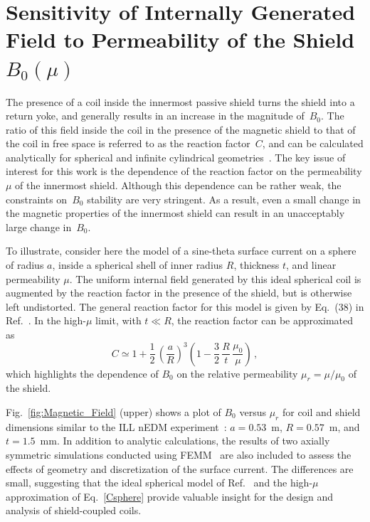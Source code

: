 

\section{Sensitivity of Internally Generated Field to Permeability of the Shield $B_0(\mu)$\label{sec:calculation}}

The presence of a coil inside the innermost passive shield turns the
shield into a return yoke, and generally results in an increase in the
magnitude of~$B_0$. The ratio of this field inside the coil in the
presence of the magnetic shield to that of the coil in free space is
referred to as the reaction factor~$C$, and can be calculated
analytically for spherical and infinite cylindrical
geometries~\cite{bidinosti2014passive,urankar1996design}. The key issue of
interest for this work is the dependence of the reaction factor on the
permeability $\mu$ of the innermost shield.  Although this dependence
can be rather weak, the constraints on~$B_0$ stability are very
stringent. As a result, even a small change in the magnetic
properties of the innermost shield can result in an unacceptably large
change in~$B_0$.


To illustrate, consider here the model of a sine-theta surface
current on a sphere of radius $a$, inside a spherical shell of inner
radius $R$, thickness $t$, and linear permeability $\mu$. The uniform
internal field generated by this ideal spherical coil is augmented by
the reaction factor in the presence of the shield, but is otherwise
left undistorted.  The general reaction factor for this model is given
by Eq.~(38) in Ref.~\cite{bidinosti2014passive}.  In the high-$\mu$
limit, with $t\ll R$, the reaction factor can be approximated as
\begin{equation}
C 
 \simeq 1+ \frac{1}{2}\, \left( \frac{a}{R} \right)^{3} \left( 1- \frac{3}{2} \, \frac{R}{t} \, \frac{\mu_0}{\mu} \right) \, ,
 \label{Csphere}
\end{equation}
which highlights the dependence of $B_0$ on the relative permeability
$\mu_r=\mu/\mu_0$ of the shield.

Fig.~\ref{fig:Magnetic_Field} (upper) shows a plot of $B_0$ versus
$\mu_r$ for coil and shield dimensions similar to the ILL nEDM
experiment~\cite{Baker2006,knecht}: $a=0.53$~m, $R= 0.57$~m, and
$t=1.5$~mm.  In addition to analytic calculations, the
results of two axially symmetric simulations conducted using
FEMM~\cite{femm} are also included to assess the effects of geometry and
discretization of the surface current. The differences are small,
suggesting that the ideal spherical model of
Ref.~\cite{bidinosti2014passive} and the high-$\mu$ approximation of
Eq.~\ref{Csphere} provide valuable insight for the design and analysis
of shield-coupled coils.

